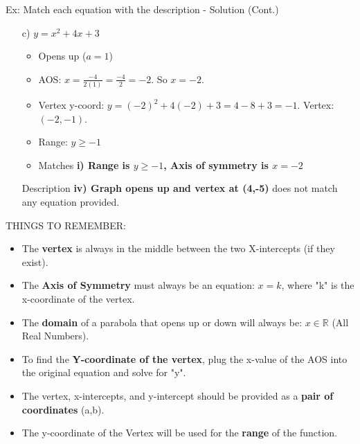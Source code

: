 \documentclass[aspectratio=169]{beamer}
\begin{document}
\begin{frame}{Ex: Match each equation with the description - Solution (Cont.)}
    \begin{tcolorbox}[colback=lightgray,colframe=accent,title=Detailed Solutions (Cont.)]
        \footnotesize
        \begin{enumerate}
            \setcounter{enumi}{2}
            \item[c)] $y = x^2 + 4x + 3$
            \begin{itemize}
                \item Opens up ($a=1$)
                \item AOS: $x = \frac{-4}{2(1)} = \frac{-4}{2} = -2$. So $x=-2$.
                \item Vertex y-coord: $y = (-2)^2 + 4(-2) + 3 = 4 - 8 + 3 = -1$. Vertex: $(-2,-1)$.
                \item Range: $y \ge -1$
                \item Matches \textbf{i) Range is $y \ge -1$, Axis of symmetry is $x = -2$}
            \end{itemize}
            
            \item[] Description \textbf{iv) Graph opens up and vertex at (4,-5)} does not match any equation provided.
        \end{enumerate}
    \end{tcolorbox}
\end{frame}

\begin{frame}{THINGS TO REMEMBER:}
    \begin{tcolorbox}[colback=lightgray,colframe=primary,title=Key Reminders]
        \footnotesize
        \begin{itemize}
            \item The \textbf{vertex} is always in the middle between the two X-intercepts (if they exist).
            \item The \textbf{Axis of Symmetry} must always be an equation: $x = k$, where "k" is the x-coordinate of the vertex.
            \item The \textbf{domain} of a parabola that opens up or down will always be: $x \in \mathbb{R}$ (All Real Numbers).
            \item To find the \textbf{Y-coordinate of the vertex}, plug the x-value of the AOS into the original equation and solve for "y".
            \item The vertex, x-intercepts, and y-intercept should be provided as a \textbf{pair of coordinates} (a,b).
            \item The y-coordinate of the Vertex will be used for the \textbf{range} of the function.
        \end{itemize}
    \end{tcolorbox}
\end{frame}
\end{document}
